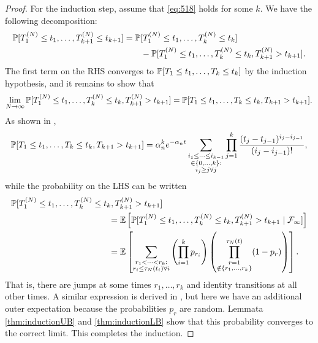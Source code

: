\begin{proof}
For the induction step, assume that \eqref{eq:518} holds for some $k$. 
We have the following decomposition:
\begin{align*}
\mathbb{P}[ T_1^{(N)} \leq t_1, \dots , T_{k+1}^{(N)} \leq t_{k+1} ]
&= \mathbb{P}[ T_1^{(N)} \leq t_1, \dots , T_k^{(N)} \leq t_k ] \\
        &\qquad- \mathbb{P}[ T_1^{(N)} \leq t_1, \dots , T_k^{(N)} \leq t_k, T_{k+1}^{(N)} > t_{k+1} ] .
\end{align*}
The first term on the RHS converges to $\mathbb{P}[ T_1 \leq t_1, \dots , T_k \leq t_k ]$ by the induction hypothesis, and it remains to show that
\begin{equation*}
\lim_{N\to\infty} 
        \mathbb{P}[ T_1^{(N)} \leq t_1, \dots , T_k^{(N)} \leq t_k, T_{k+1}^{(N)} > t_{k+1} ]
= \mathbb{P}[ T_1\leq t_1, \dots , T_k \leq t_k, T_{k+1} > t_{k+1} ] .
\end{equation*}
As shown in \textcite{mohle1999},
\begin{equation*}
\mathbb{P}[ T_1\leq t_1, \dots , T_k \leq t_k, T_{k+1} > t_{k+1} ]
= \alpha_n^k e^{-\alpha_n t} 
        \sum_{\substack{i_1\leq \dots\leq i_{k-1}\\ \in \{0,\dots,k\} :
        \\ i_j \geq j \forall j}} 
        \prod_{j=1}^k \frac{(t_j - t_{j-1})^{i_j - i_{j-1}}}{(i_j - i_{j-1})! } ,
\end{equation*}
while the probability on the LHS can be written
\begin{align*}
&\Prob[ T_1^{(N)} \leq t_1, \dots , T_k^{(N)} \leq t_k, T_{k+1}^{(N)} > t_{k+1} ] \\
&\hspace{4cm}= \E\left[ \Prob[ T_1^{(N)} \leq t_1, \dots , T_k^{(N)} \leq t_k, T_{k+1}^{(N)} > t_{k+1} 
        \mid \mathcal{F}_\infty] \right] \\
&\hspace{4cm}= \E \left[ \sum_{\substack{r_1 <\dots< r_k :
        \\ r_i \leq \tau_N(t_i) \forall i}}
        \left( \prod_{i=1}^k p_{r_i} \right)
        \left( \prod_{\substack{r=1 \\ \notin \{r_1,\dots,r_k\} }}^{\tau_N(t)} 
        (1-p_r) \right) \right] .
\end{align*}
That is, there are jumps at some times $r_1, \dots, r_k$ and identity transitions at all other times.
A similar expression is derived in \textcite{mohle1999}, but here we have an additional outer expectation because the probabilities $p_r$ are random.
Lemmata \ref{thm:inductionUB} and \ref{thm:inductionLB} show that this probability converges to the correct limit.
This completes the induction.
\end{proof}


